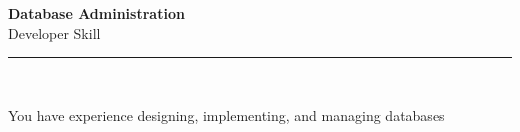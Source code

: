 \documentclass[11pt,a4paper]{memoir}
\begin{document}
    \begin{Spacing}{0.75}%
        \noindent
        \large
        \textbf{Database Administration}\\[3pt]
        \scriptsize\color{gray}Developer Skill\\ 
        \rule{\textwidth}{.3mm}\\
        
        \vspace{3mm}
        \noindent
        \begin{minipage}[t]{53mm}
            \begin{flushleft}
            {
                \normalsize
                \begin{Spacing}{1}%
                \color{black}\textrm{You have experience designing, implementing, and managing databases}\\
                \end{Spacing}
            }
            \end{flushleft}
        \end{minipage}

        \vspace{5mm}
        \noindent
        \begin{minipage}[t]{53mm}
            \begin{flushleft}
            {
                \normalsize
                \begin{Spacing}{1}%
                \color{gray}\textit{}\\
                \end{Spacing}
            }
            \end{flushleft}
        \end{minipage}
    \end{Spacing}
    \clearpage
\end{document}
